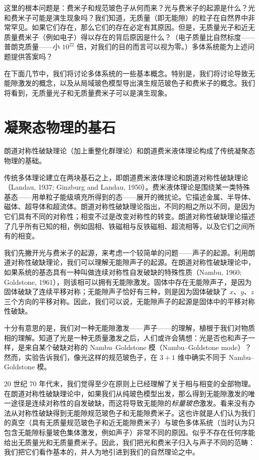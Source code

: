 这里的根本问题是：费米子和规范玻色子从何而来？光与费米子的起源是什么？光和费米子可能是演生现象吗？我们知道，无质量（即无能隙）的粒子在自然界中非常罕见。如果它们存在，那么它们的存在必定有其原因。但是，无质量光子和近无质量费米子（例如电子）得以存在的背后原因是什么？（电子质量比自然标度——普朗克质量——小 $10^{22}$ 倍，对我们的目的而言可以视为零。）多体系统能为上述问题提供答案吗？

在下面几节中，我们将讨论多体系统的一些基本概念。特别是，我们将讨论导致无能隙激发的概念，以及从局域玻色模型导出演生规范玻色子和费米子的概念。我们将看到，无质量光子和无质量费米子可以是演生现象。

\section{凝聚态物理的基石}

\begin{keypoints}
\item 朗道对称性破缺理论（加上重整化群理论）和朗道费米液体理论构成了传统凝聚态物理的基础。
\end{keypoints}

传统多体理论建立在两块基石之上，即朗道费米液体理论和朗道对称性破缺理论（Landau, 1937; Ginzburg and Landau, 1950）。费米液体理论是围绕某一类特殊基态——用单粒子能级填充所得到的态——展开的微扰论。它描述金属、半导体、磁体、超导体和超流体。朗道对称性破缺理论指出，不同的相之所以不同，是因为它们具有不同的对称性；相变不过是改变对称性的转变。朗道对称性破缺理论描述了几乎所有已知的相，例如固相、铁磁相与反铁磁相、超流相等，以及它们之间所有的相变。

我们先撇开光与费米子的起源，来考虑一个较简单的问题——声子的起源。利用朗道对称性破缺理论，我们可以理解无能隙声子的起源。在朗道对称性破缺理论中，如果系统的基态具有一种叫做连续对称性自发破缺的特殊性质（Nambu, 1960; Goldstone, 1961），则该相可以拥有无能隙激发。固体中存在无能隙声子，是因为固体破缺了连续平移对称；无能隙声子恰好有三种，则是因为固体破缺了 $x$、$y$、$z$ 三个方向的平移对称。因此，我们可以说，无能隙声子的起源是固体中的平移对称性破缺。

十分有意思的是，我们对一种无能隙激发——声子——的理解，植根于我们对物质相的理解。知道了光是一种无质量激发之后，人们或许会猜想：光是否也和声子一样，是来自某个破缺对称的 Nambu–Goldstone 模（Nambu–Goldstone mode）？然而，实验告诉我们，像光这样的规范玻色子，在 $3+1$ 维中确实不同于 Nambu–Goldstone 模。

20 世纪 70 年代末，我们觉得至少在原则上已经理解了关于相与相变的全部物理。在朗道对称性破缺理论中，如果我们从纯玻色模型出发，那么得到无能隙激发的唯一途径是连续对称性的自发破缺，而这将导致无能隙的\emph{标量玻色}激发。看来没有办法从对称性破缺得到无能隙规范玻色子和无能隙费米子。这也许就是人们认为我们的真空（具有无质量规范玻色子和近无能隙费米子）与玻色多体系统（当时认为只包含无能隙标量玻色集体激发，例如声子）非常不同的原因。似乎不存在任何序能给出无质量光和无质量费米子。因此，我们把光和费米子归入与声子不同的范畴：我们把它们看作基本的，并人为地引进到我们的自然理论之中。

